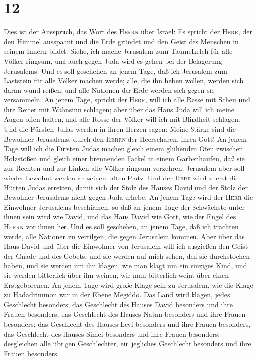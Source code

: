 \hypertarget{section-11}{%
\section{12}\label{section-11}}

 Dies ist der Ausspruch, das Wort des \textsc{Herrn} über
Israel: Es spricht der \textsc{Herr}, der den Himmel ausspannt und die
Erde gründet und den Geist des Menschen in seinem Innern bildet:
 Siehe, ich mache Jerusalem zum Taumelkelch für alle
Völker ringsum, und auch gegen Juda wird es gehen bei der Belagerung
Jerusalems.  Und es soll geschehen an jenem Tage, daß ich
Jerusalem zum Laststein für alle Völker machen werde; alle, die ihn
heben wollen, werden sich daran wund reißen; und alle Nationen der Erde
werden sich gegen sie versammeln.  An jenem Tage, spricht
der \textsc{Herr}, will ich alle Rosse mit Scheu und ihre Reiter mit
Wahnsinn schlagen; aber über das Haus Juda will ich meine Augen offen
halten, und alle Rosse der Völker will ich mit Blindheit schlagen.
 Und die Fürsten Judas werden in ihren Herzen sagen: Meine
Stärke sind die Bewohner Jerusalems, durch den \textsc{Herrn} der
Heerscharen, ihren Gott!  An jenem Tage will ich die
Fürsten Judas machen gleich einem glühenden Ofen zwischen Holzstößen und
gleich einer brennenden Fackel in einem Garbenhaufen, daß sie zur
Rechten und zur Linken alle Völker ringsum verzehren; Jerusalem aber
soll wieder bewohnt werden an seinem alten Platz.  Und der
\textsc{Herr} wird zuerst die Hütten Judas erretten, damit sich der
Stolz des Hauses David und der Stolz der Bewohner Jerusalems nicht gegen
Juda erhebe.  An jenem Tage wird der \textsc{Herr} die
Einwohner Jerusalems beschirmen, so daß an jenem Tage der Schwächste
unter ihnen sein wird wie David, und das Haus David wie Gott, wie der
Engel des \textsc{Herrn} vor ihnen her.  Und es soll
geschehen, an jenem Tage, daß ich trachten werde, alle Nationen zu
vertilgen, die gegen Jerusalem kommen.  Aber über das
Haus David und über die Einwohner von Jerusalem will ich ausgießen den
Geist der Gnade und des Gebets, und sie werden auf mich sehen, den sie
durchstochen haben, und sie werden um ihn klagen, wie man klagt um ein
einziges Kind, und sie werden bitterlich über ihn weinen, wie man
bitterlich weint über einen Erstgeborenen.  An jenem Tage
wird große Klage sein zu Jerusalem, wie die Klage zu Hadadrimmon war in
der Ebene Megiddo.  Das Land wird klagen, jedes
Geschlecht besonders; das Geschlecht des Hauses David besonders und ihre
Frauen besonders, das Geschlecht des Hauses Natan besonders und ihre
Frauen besonders;  das Geschlecht des Hauses Levi
besonders und ihre Frauen besonders, das Geschlecht des Hauses Simei
besonders und ihre Frauen besonders;  desgleichen alle
übrigen Geschlechter, ein jegliches Geschlecht besonders und ihre Frauen
besonders.

